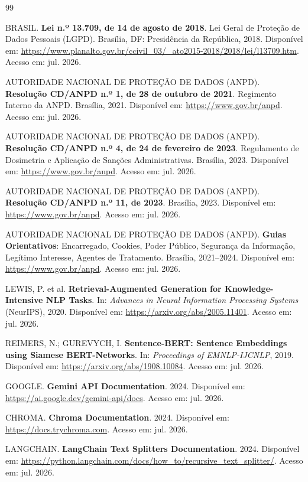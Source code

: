 \documentclass[
  12pt,
  a4paper,
  brazil,
  article,
  oneside,
  sumario=tradicional
]{abntex2}
\begin{document}
\begin{thebibliography}{99}

BRASIL. \textbf{Lei n.º 13.709, de 14 de agosto de 2018}. Lei Geral de Proteção de
Dados Pessoais (LGPD). Brasília, DF: Presidência da República, 2018. Disponível em:
\url{https://www.planalto.gov.br/ccivil_03/_ato2015-2018/2018/lei/l13709.htm}.
Acesso em: jul. 2026.

AUTORIDADE NACIONAL DE PROTEÇÃO DE DADOS (ANPD). \textbf{Resolução CD/ANPD n.º 1,
de 28 de outubro de 2021}. Regimento Interno da ANPD. Brasília, 2021. Disponível em:
\url{https://www.gov.br/anpd}. Acesso em: jul. 2026.

AUTORIDADE NACIONAL DE PROTEÇÃO DE DADOS (ANPD). \textbf{Resolução CD/ANPD n.º 4,
de 24 de fevereiro de 2023}. Regulamento de Dosimetria e Aplicação de Sanções
Administrativas. Brasília, 2023. Disponível em: \url{https://www.gov.br/anpd}.
Acesso em: jul. 2026.

AUTORIDADE NACIONAL DE PROTEÇÃO DE DADOS (ANPD). \textbf{Resolução CD/ANPD n.º 11,
de 2023}. Brasília, 2023. Disponível em: \url{https://www.gov.br/anpd}.
Acesso em: jul. 2026.

AUTORIDADE NACIONAL DE PROTEÇÃO DE DADOS (ANPD). \textbf{Guias Orientativos}:
Encarregado, Cookies, Poder Público, Segurança da Informação, Legítimo Interesse,
Agentes de Tratamento. Brasília, 2021--2024. Disponível em:
\url{https://www.gov.br/anpd}. Acesso em: jul. 2026.

LEWIS, P. et al. \textbf{Retrieval-Augmented Generation for Knowledge-Intensive NLP
Tasks}. In: \textit{Advances in Neural Information Processing Systems} (NeurIPS),
2020. Disponível em: \url{https://arxiv.org/abs/2005.11401}. Acesso em: jul. 2026.

REIMERS, N.; GUREVYCH, I. \textbf{Sentence-BERT: Sentence Embeddings using Siamese
BERT-Networks}. In: \textit{Proceedings of EMNLP-IJCNLP}, 2019. Disponível em:
\url{https://arxiv.org/abs/1908.10084}. Acesso em: jul. 2026.

GOOGLE. \textbf{Gemini API Documentation}. 2024. Disponível em:
\url{https://ai.google.dev/gemini-api/docs}. Acesso em: jul. 2026.

CHROMA. \textbf{Chroma Documentation}. 2024. Disponível em:
\url{https://docs.trychroma.com}. Acesso em: jul. 2026.

LANGCHAIN. \textbf{LangChain Text Splitters Documentation}. 2024. Disponível em:
\url{https://python.langchain.com/docs/how_to/recursive_text_splitter/}.
Acesso em: jul. 2026.

\end{thebibliography}
\end{document}
